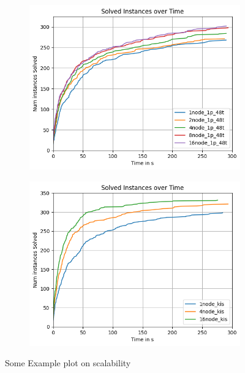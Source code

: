 \documentclass[12pt,a4paper,twoside]{scrartcl}
\numberwithin{equation}{section}
\begin{document}
\begin{figure}
  \center
  \begin{subfigure}[c]{\textwidth}
    \center
    \includegraphics{plots/cumulative_runtime/scalability_gim.png}
    \label{fig:runtimeCompareGim}
  \end{subfigure}
  \hfill
  \begin{subfigure}[c]{\textwidth}
    \center
    \includegraphics{plots/cumulative_runtime/scalability_kis.png}
    \label{fig:runtimeCompareKis}
  \end{subfigure}
  \caption{Some Example plot on scalability}
  \label{fig:scale}
\end{figure}
\end{document}
